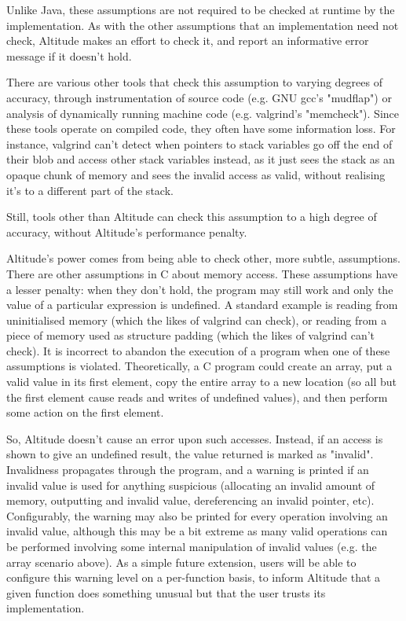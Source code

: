 \documentclass[10pt,a4paper]{report}
\begin{document}
Unlike Java, these assumptions are not required to be checked at runtime by the implementation. As with the other assumptions that an implementation need not check, Altitude makes an effort to check it, and report an informative error message if it doesn't hold.

There are various other tools that check this assumption to varying degrees of accuracy, through instrumentation of source code (e.g. GNU gcc's "mudflap") or analysis of dynamically running machine code (e.g. valgrind's "memcheck"). Since these tools operate on compiled code, they often have some information loss. For instance, valgrind can't detect when pointers to stack variables go off the end of their blob and access other stack variables instead, as it just sees the stack as an opaque chunk of memory and sees the invalid access as valid, without realising it's to a different part of the stack.

Still, tools other than Altitude can check this assumption to a high degree of accuracy, without Altitude's performance penalty.

Altitude's power comes from being able to check other, more subtle, assumptions. There are other assumptions in C about memory access. These assumptions have a lesser penalty: when they don't hold, the program may still work and only the value of a particular expression is undefined. A standard example is reading from uninitialised memory (which the likes of valgrind can check), or reading from a piece of memory used as structure padding (which the likes of valgrind can't check). It is incorrect to abandon the execution of a program when one of these assumptions is violated. Theoretically, a C program could create an array, put a valid value in its first element, copy the entire array to a new location (so all but the first element cause reads and writes of undefined values), and then perform some action on the first element.

So, Altitude doesn't cause an error upon such accesses. Instead, if an access is shown to give an undefined result, the value returned is marked as "invalid". Invalidness propagates through the program, and a warning is printed if an invalid value is used for anything suspicious (allocating an invalid amount of memory, outputting and invalid value, dereferencing an invalid pointer, etc). Configurably, the warning may also be printed for every operation involving an invalid value, although this may be a bit extreme as many valid operations can be performed involving some internal manipulation of invalid values (e.g. the array scenario above). As a simple future extension, users will be able to configure this warning level on a per-function basis, to inform Altitude that a given function does something unusual but that the user trusts its implementation.
\end{document}

